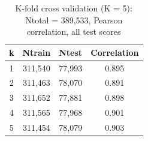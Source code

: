 \begin{table}
\caption{K-fold cross validation (K = 5): Ntotal = 389,533, Pearson correlation, all test scores}
\begin{center}
\begin{tabular}{ |c|c|c|c| } 
\hline
\textbf{k} & \textbf{Ntrain} & \textbf{Ntest} & \textbf{Correlation}\\
\hline
1 & 311,540 & 77,993 & 0.895\\
\hline
2 & 311,463 & 78,070 & 0.891\\
\hline
3 & 311,652 & 77,881 & 0.898\\
\hline
4 & 311,565 & 77,968 & 0.901\\
\hline
5 & 311,454 & 78,079 & 0.903\\
\hline
\end{tabular}
\end{center}
\label{table:ba_cmp_xval}
\end{table}


